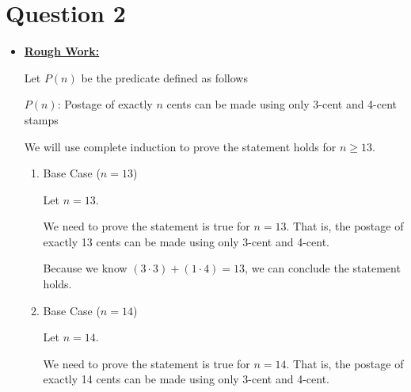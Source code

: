 \documentclass[12pt]{article}
\begin{document}
\section*{Question 2}
\begin{itemize}
    \item

    \bigskip

    \begin{mdframed}
        \underline{\textbf{Rough Work:}}

        \bigskip

        Let $P(n)$ be the predicate defined as follows

        \bigskip

        \begin{center}
            $P(n)$: Postage of exactly $n$ cents can be made using only 3-cent and 4-cent stamps
        \end{center}

        \bigskip

        We will use complete induction to prove the statement holds for $n \geq 13$.

        \begin{enumerate}[1.]
            \item Base Case ($n = 13$)

            \begin{mdframed}
            Let $n = 13$.

            \bigskip

            We need to prove the statement is true for $n = 13$. That is, the
            postage of exactly 13 cents can be made using only 3-cent and 4-cent.

            \bigskip

            Because we know $(3 \cdot 3) + (1 \cdot 4)=13$, we can conclude the statement holds.

            \end{mdframed}

            \item Base Case ($n = 14$)

            \begin{mdframed}
            Let $n = 14$.

            \bigskip

            We need to prove the statement is true for $n = 14$. That is, the
            postage of exactly 14 cents can be made using only 3-cent and 4-cent.


\end{mdframed}
\end{enumerate}
\end{mdframed}
\end{itemize}
\end{document}
